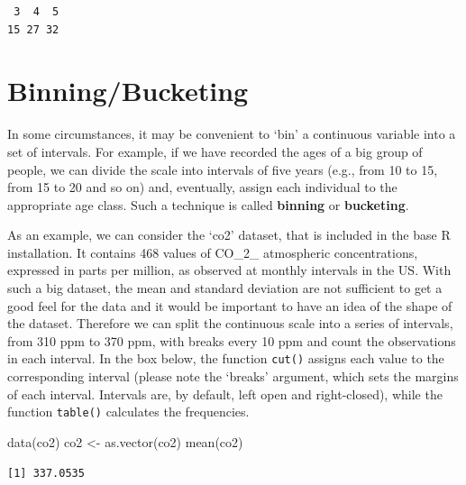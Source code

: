 \documentclass[
  letterpaper,
  DIV=11,
  numbers=noendperiod]{scrreprt}
\newenvironment{Shaded}{\begin{snugshade}}{\end{snugshade}}
\newcommand{\FunctionTok}[1]{\textcolor[rgb]{0.28,0.35,0.67}{#1}}
\newcommand{\NormalTok}[1]{\textcolor[rgb]{0.00,0.23,0.31}{#1}}
\newcommand{\OtherTok}[1]{\textcolor[rgb]{0.00,0.23,0.31}{#1}}
\newcommand{\SpecialCharTok}[1]{\textcolor[rgb]{0.37,0.37,0.37}{#1}}
\begin{document}
\begin{Shaded}
\end{Shaded}

\begin{verbatim}
 3  4  5 
15 27 32 
\end{verbatim}

\section{Binning/Bucketing}\label{binningbucketing}

In some circumstances, it may be convenient to `bin' a continuous
variable into a set of intervals. For example, if we have recorded the
ages of a big group of people, we can divide the scale into intervals of
five years (e.g., from 10 to 15, from 15 to 20 and so on) and,
eventually, assign each individual to the appropriate age class. Such a
technique is called \textbf{binning} or \textbf{bucketing}.

As an example, we can consider the `co2' dataset, that is included in
the base R installation. It contains 468 values of CO\_2\_ atmospheric
concentrations, expressed in parts per million, as observed at monthly
intervals in the US. With such a big dataset, the mean and standard
deviation are not sufficient to get a good feel for the data and it
would be important to have an idea of the shape of the dataset.
Therefore we can split the continuous scale into a series of intervals,
from 310 ppm to 370 ppm, with breaks every 10 ppm and count the
observations in each interval. In the box below, the function
\texttt{cut()} assigns each value to the corresponding interval (please
note the `breaks' argument, which sets the margins of each interval.
Intervals are, by default, left open and right-closed), while the
function \texttt{table()} calculates the frequencies.

\begin{Shaded}
\begin{Highlighting}[]
\FunctionTok{data}\NormalTok{(co2)}
\NormalTok{co2 }\OtherTok{\textless{}{-}} \FunctionTok{as.vector}\NormalTok{(co2)}
\FunctionTok{mean}\NormalTok{(co2)}
\end{Highlighting}
\end{Shaded}

\begin{verbatim}
[1] 337.0535
\end{verbatim}
\end{document}
